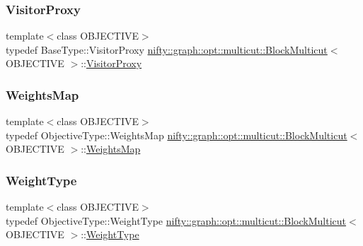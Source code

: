 \subsubsection{\texorpdfstring{Visitor\+Proxy}{VisitorProxy}}
{\footnotesize\ttfamily template$<$class O\+B\+J\+E\+C\+T\+I\+VE$>$ \\
typedef Base\+Type\+::\+Visitor\+Proxy \hyperlink{classnifty_1_1graph_1_1opt_1_1multicut_1_1BlockMulticut}{nifty\+::graph\+::opt\+::multicut\+::\+Block\+Multicut}$<$ O\+B\+J\+E\+C\+T\+I\+VE $>$\+::\hyperlink{classnifty_1_1graph_1_1opt_1_1multicut_1_1BlockMulticut_afc4c4a7b58fd11f84feab8791e1a0e94}{Visitor\+Proxy}}

\mbox{\label{classnifty_1_1graph_1_1opt_1_1multicut_1_1BlockMulticut_ac809724222ec8a96dfe99b414fb57168}} 
\subsubsection{\texorpdfstring{Weights\+Map}{WeightsMap}}
{\footnotesize\ttfamily template$<$class O\+B\+J\+E\+C\+T\+I\+VE$>$ \\
typedef Objective\+Type\+::\+Weights\+Map \hyperlink{classnifty_1_1graph_1_1opt_1_1multicut_1_1BlockMulticut}{nifty\+::graph\+::opt\+::multicut\+::\+Block\+Multicut}$<$ O\+B\+J\+E\+C\+T\+I\+VE $>$\+::\hyperlink{classnifty_1_1graph_1_1opt_1_1multicut_1_1BlockMulticut_ac809724222ec8a96dfe99b414fb57168}{Weights\+Map}}

\mbox{\label{classnifty_1_1graph_1_1opt_1_1multicut_1_1BlockMulticut_ac321d376710cf907c0ede34c536c79a5}} 
\subsubsection{\texorpdfstring{Weight\+Type}{WeightType}}
{\footnotesize\ttfamily template$<$class O\+B\+J\+E\+C\+T\+I\+VE$>$ \\
typedef Objective\+Type\+::\+Weight\+Type \hyperlink{classnifty_1_1graph_1_1opt_1_1multicut_1_1BlockMulticut}{nifty\+::graph\+::opt\+::multicut\+::\+Block\+Multicut}$<$ O\+B\+J\+E\+C\+T\+I\+VE $>$\+::\hyperlink{classnifty_1_1graph_1_1opt_1_1multicut_1_1BlockMulticut_ac321d376710cf907c0ede34c536c79a5}{Weight\+Type}}



